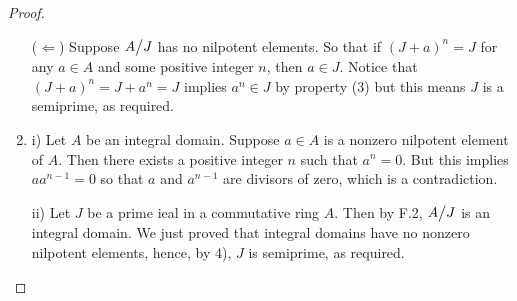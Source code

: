 \begin{proof}
\begin{enumerate}
 ($\Leftarrow$) Suppose ${\textstyle A}\big/{\textstyle J}$ has no nilpotent elements. So that if $(J+a)^{n}=J$ for any $a\in A$ and some positive integer $n$, then $a\in J$. Notice that $(J+a)^{n}=J+a^{n}=J$ implies $a^{n}\in J$ by property (3) but this means $J$ is a semiprime, as required.
 \item i) Let $A$ be an integral domain. Suppose $a\in A$ is a nonzero nilpotent element of $A$. Then there exists a positive integer $n$ such that $a^{n}=0$. But this implies $aa^{n-1}=0$ so that $a$ and $a^{n-1}$ are divisors of zero, which is a contradiction.

 ii) Let $J$ be a prime ieal in a commutative ring $A$. Then by F.2, ${\textstyle A}\big/{\textstyle J}$ is an integral domain. We just proved that integral domains have no nonzero nilpotent elements, hence, by 4), $J$ is semiprime, as required.
\end{enumerate}
\end{proof}


